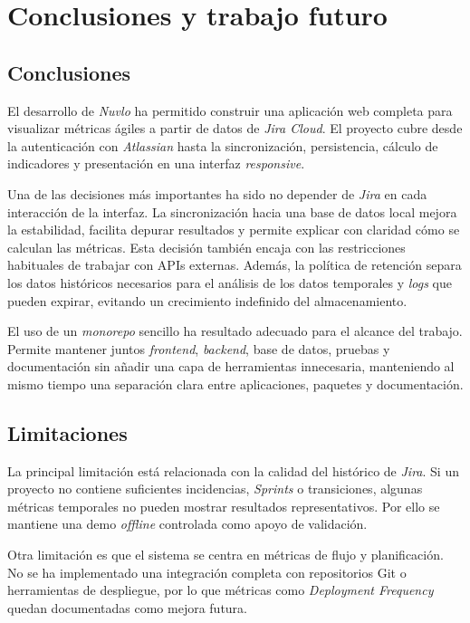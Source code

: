\chapter{Conclusiones y trabajo futuro}

\section{Conclusiones}

El desarrollo de \textit{Nuvlo} ha permitido construir una aplicación web completa para visualizar métricas ágiles a partir de datos de \textit{Jira Cloud}. El proyecto cubre desde la autenticación con \textit{Atlassian} hasta la sincronización, persistencia, cálculo de indicadores y presentación en una interfaz \textit{responsive}.

Una de las decisiones más importantes ha sido no depender de \textit{Jira} en cada interacción de la interfaz. La sincronización hacia una base de datos local mejora la estabilidad, facilita depurar resultados y permite explicar con claridad cómo se calculan las métricas. Esta decisión también encaja con las restricciones habituales de trabajar con APIs externas. Además, la política de retención separa los datos históricos necesarios para el análisis de los datos temporales y \textit{logs} que pueden expirar, evitando un crecimiento indefinido del almacenamiento.

El uso de un \textit{monorepo} sencillo ha resultado adecuado para el alcance del trabajo. Permite mantener juntos \textit{frontend}, \textit{backend}, base de datos, pruebas y documentación sin añadir una capa de herramientas innecesaria, manteniendo al mismo tiempo una separación clara entre aplicaciones, paquetes y documentación.

\section{Limitaciones}

La principal limitación está relacionada con la calidad del histórico de \textit{Jira}. Si un proyecto no contiene suficientes incidencias, \textit{Sprints} o transiciones, algunas métricas temporales no pueden mostrar resultados representativos. Por ello se mantiene una demo \textit{offline} controlada como apoyo de validación.

Otra limitación es que el sistema se centra en métricas de flujo y planificación. No se ha implementado una integración completa con repositorios Git o herramientas de despliegue, por lo que métricas como \textit{Deployment Frequency} quedan documentadas como mejora futura.

